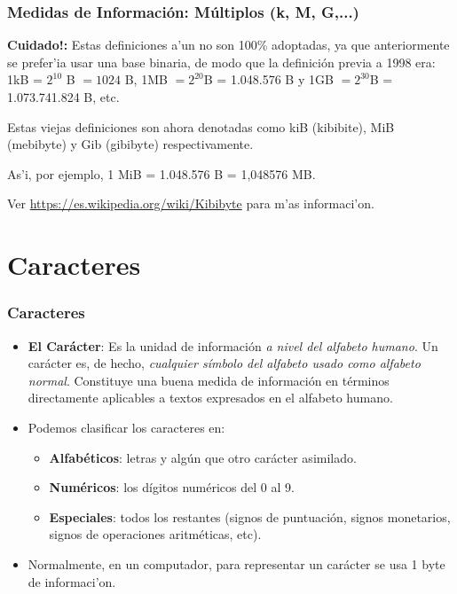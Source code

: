 \documentclass{beamer}
\begin{document}
\begin{frame}[fragile]\frametitle{Medidas de Información: Múltiplos (k, M, G,...)}

\begin{block}{}
\textbf{Cuidado!:} Estas definiciones a'un no son 100\% adoptadas, ya que anteriormente se prefer'ia usar una base binaria, de modo que la definici\'on previa a 1998 era: 1kB = $2^{10}$ B $=1024$ B, 1MB $=2^{20}$B = 1.048.576 B y 1GB $=2^{30}$B = 1.073.741.824 B, etc. 
\end{block}

\begin{block}{}
Estas viejas definiciones son ahora denotadas como kiB (kibibite), MiB (mebibyte) y  Gib (gibibyte) respectivamente. 
\end{block}
\begin{block}{}
As'i, por ejemplo, 1 MiB = 1.048.576 B = 1,048576 MB.
\end{block}
Ver \url{https://es.wikipedia.org/wiki/Kibibyte} para m'as informaci'on.
\end{frame}

\section{Caracteres}
\begin{frame}[fragile]\frametitle{Caracteres}
\begin{itemize}

\item \textbf{El Carácter}: Es la unidad de información \textit{a nivel del alfabeto humano}. Un carácter es, de hecho, \textit{cualquier símbolo del alfabeto usado como alfabeto normal}. Constituye una buena medida de información en términos directamente aplicables a textos expresados en el alfabeto humano.

\item Podemos clasificar los caracteres en:
	\begin{itemize}
		\item \textbf{Alfabéticos}: letras y algún que otro carácter asimilado.
		\item \textbf{Numéricos}: los dígitos numéricos del 0 al 9.
		\item \textbf{Especiales}: todos los restantes (signos de puntuación, signos monetarios, signos de operaciones aritméticas, etc).
	\end{itemize}
	\item Normalmente, en un computador, para representar un carácter se usa 1 byte de informaci'on.
\end{itemize}
\end{frame}
\end{document}
